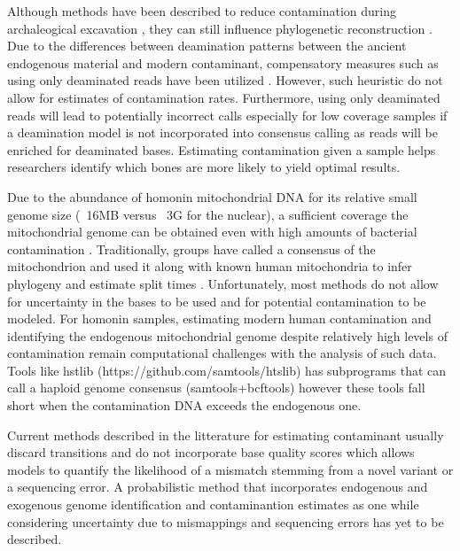 \documentclass[a4paper,12pt]{article}
\begin{document}
Although methods have been described to reduce contamination during archaleogical excavation \cite{yang2005contamination}, they can still influence phylogenetic reconstruction \cite{wall2007inconsistencies}. Due to the differences between deamination patterns between the ancient endogenous material and modern contaminant, compensatory measures such as using only deaminated reads have been utilized \cite{skoglund2014separating}. However, such heuristic do not allow for estimates of contamination rates. Furthermore, using only deaminated reads will lead to potentially incorrect calls especially for low coverage samples if a deamination model is not incorporated into consensus calling as reads will be enriched for deaminated bases. Estimating contamination given a sample helps researchers identify which bones are more likely to yield optimal results. 

Due to the abundance of homonin mitochondrial DNA for its relative small genome size (~16MB versus ~3G for the nuclear), a sufficient coverage the mitochondrial genome can be obtained even with high amounts of bacterial contamination \cite{green2006analysis}. Traditionally, groups have called a consensus of the mitochondrion and used it along with known human mitochondria to infer phylogeny and estimate split times \cite{cann1987mitochondrial}. Unfortunately, most methods do not allow for uncertainty in the bases to be used and for potential contamination to be modeled. For homonin samples, estimating modern human contamination and identifying the endogenous mitochondrial genome despite relatively high levels of contamination remain computational challenges with the analysis of such data. Tools like hstlib (https://github.com/samtools/htslib) has subprograms that can call a haploid genome consensus (samtools+bcftools) however these tools fall short when the contamination DNA exceeds the endogenous one. 

Current methods described in the litterature for estimating contaminant usually discard transitions and do not incorporate base quality scores which allows models to quantify the likelihood of a mismatch stemming from a novel variant or a sequencing error. A probabilistic method that incorporates endogenous and exogenous genome identification and contaminantion estimates as one while considering uncertainty due to mismappings and sequencing errors has yet to be described. 

\end{document}
